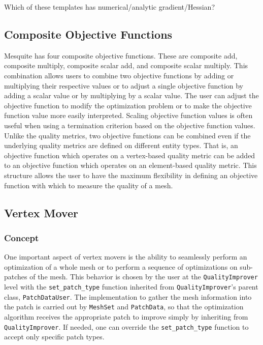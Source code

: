 \documentclass[letter]{report}
\begin{document}
Which of these templates has numerical/analytic gradient/Hessian?

\subsection{Composite Objective Functions}

Mesquite has four composite objective functions.  These are
composite add, composite multiply, composite scalar add, and
composite scalar multiply.  This combination allows users
to combine two objective functions by adding or multiplying
their respective values or to adjust a single objective function
by adding a scalar value or by multiplying by a scalar value.  
The user can adjust the objective function to modify the
optimization problem or to make the objective function value
more easily interpreted.  Scaling objective function values
is often useful when using a termination criterion based on the
objective function values. Unlike the quality metrics, 
two objective functions can be combined
even if the underlying quality metrics are defined on different entity
types.  That is, an objective function which operates on a vertex-based
quality metric can be added to an objective function which operates
on an element-based quality metric.  This structure allows the user
to have the maximum flexibility in defining an objective function with
which to measure the quality of a mesh.

\subsection{Vertex Mover}

\subsubsection{Concept}

One important aspect of vertex movers is
the ability to seamlessly perform an optimization of a whole mesh or
to perform a sequence of optimizations on sub-patches of the mesh.
This behavior is chosen by the user at the \texttt{QualityImprover}
level with the \texttt{set\_patch\_type} function inherited from
\texttt{QualityImprover}'s parent class, \texttt{PatchDataUser}. The
implementation to gather the mesh information into the patch is
carried out by \texttt{MeshSet} and \texttt{PatchData}, so that the
optimization algorithm receives the appropriate patch to improve
simply by inheriting from \texttt{QualityImprover}.  If needed, one can 
override the \texttt{set\_patch\_type} function to accept only specific
patch types.
\end{document}
